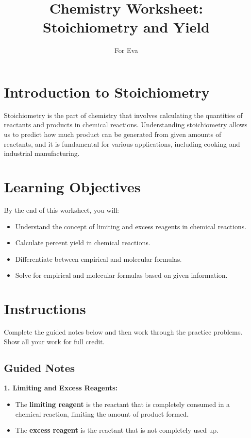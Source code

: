 \documentclass[12pt]{article}
\begin{document}
\title{Chemistry Worksheet: Stoichiometry and Yield}
\author{For Eva}
\date{}
\maketitle

\section*{Introduction to Stoichiometry}
Stoichiometry is the part of chemistry that involves calculating the quantities of reactants and products in chemical reactions. Understanding stoichiometry allows us to predict how much product can be generated from given amounts of reactants, and it is fundamental for various applications, including cooking and industrial manufacturing.

\section*{Learning Objectives}
By the end of this worksheet, you will:
\begin{itemize}
    \item Understand the concept of limiting and excess reagents in chemical reactions.
    \item Calculate percent yield in chemical reactions.
    \item Differentiate between empirical and molecular formulas.
    \item Solve for empirical and molecular formulas based on given information.
\end{itemize}

\section*{Instructions}
Complete the guided notes below and then work through the practice problems. Show all your work for full credit.

\subsection*{Guided Notes}

\textbf{1. Limiting and Excess Reagents:}
\begin{itemize}
    \item The \textbf{limiting reagent} is the reactant that is completely consumed in a chemical reaction, limiting the amount of product formed.
    \item The \textbf{excess reagent} is the reactant that is not completely used up.
\end{itemize}
\end{document}
